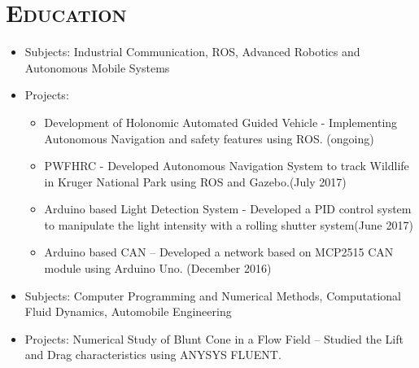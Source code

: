 \documentclass[11pt,a4paper,roman]{moderncv} %
\begin{document}


\section{\scshape{Education}}

{\begin{itemize}
\item Subjects:  Industrial Communication, ROS, Advanced Robotics and Autonomous Mobile Systems
\item Projects: 
\begin{itemize}
\item Development of Holonomic Automated Guided Vehicle - Implementing Autonomous Navigation and safety features using ROS. (ongoing)
\item PWFHRC - Developed Autonomous Navigation System to track Wildlife in Kruger National Park using ROS and Gazebo.(July 2017)
\item Arduino based Light Detection System - Developed a PID control system to manipulate the light intensity with a rolling shutter system(June 2017)
\item Arduino based CAN – Developed a network based on MCP2515 CAN module using Arduino Uno. (December 2016)
\newline{}
\end{itemize}
\end{itemize}  %
}

{\begin{itemize}
\item Subjects: Computer Programming and Numerical Methods, Computational Fluid Dynamics, Automobile Engineering
\item Projects: Numerical Study of Blunt Cone in a Flow Field – 
Studied the Lift and Drag characteristics using ANYSYS FLUENT.
\end{itemize}
}
\end{document}
